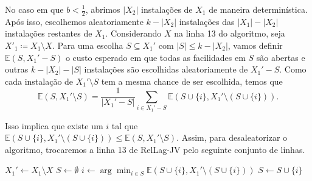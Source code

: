 No caso em que $b < \frac{1}{2}$, abrimos $|X_2|$ instalações de $X_1$ de maneira determinística. Após isso, escolhemos aleatoriamente $k - |X_2|$ instalações das $|X_1| - |X_2|$ instalações restantes de $X_1$. Considerando $X$ na linha 13 do algoritmo, seja $X'_1 \coloneqq X_1 \setminus X$. Para uma escolha $S \subseteq X_1'$ com $|S| \leq k - |X_2|$, vamos definir $\mathbb{E}(S,X_1' - S)$ o custo esperado em que todas as facilidades em $S$ são abertas e outras $k - |X_2| - |S|$ instalações são escolhidas aleatoriamente de $X_1' - S$. Como cada instalação de $X_1' \setminus S$ tem a mesma chance de ser escolhida, temos que 
\[ \mathbb{E}(S,X_1' \setminus S) = \frac{1}{|X_1' - S|}\sum_{i \in X_1' - S} \mathbb{E}(S \cup \{i\}, X_1' \setminus \left( S \cup \{i\}\right)).\]

Isso implica que existe um $i$ tal que $\mathbb{E}(S \cup \{i\}, X_1' \setminus (S \cup \{i\})) \leq \mathbb{E}(S,X_1' \setminus S)$. Assim, para desaleatorizar o algoritmo, trocaremos a linha 13 de {\sc RelLag-JV} pelo seguinte conjunto de linhas.
\begin{algorithm}
    \begin{algorithmic}[1]
        \State $X_1' \gets X_1 \setminus X$
        \State $S \gets \emptyset$
        \State $i \gets \arg\min_{i\in S} \mathbb{E}(S \cup \{i\}, X_1' \setminus \left( S \cup \{i\}\right))$
        \State $S \gets S \cup \{i\}$
        \EndWhile
    \end{algorithmic}
\end{algorithm}